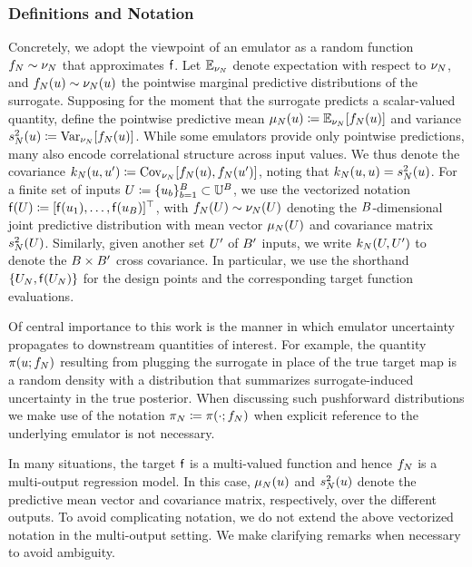 \documentclass[12pt]{article}
\begin{document}
\subsubsection{Definitions and Notation}
Concretely, we adopt the viewpoint of an emulator as a random function $f_{N} \sim \nu_{N}$ that
approximates $\mathsf{f}$. Let $\mathbb{E}_{\nu_{N}}$ denote expectation with respect to $\nu_{N}$, and $f_{N}(u) \sim \nu_{N}(u)$ the pointwise marginal predictive distributions of the surrogate. Supposing for the moment that
the surrogate predicts a scalar-valued quantity, define the pointwise 
predictive mean $\mu_{N}(u) \coloneqq \mathbb{E}_{\nu_{N}}[f_{N}(u)]$ and variance 
$s^2_{N}(u) \coloneqq \mathrm{Var}_{\nu_{N}}[f_{N}(u)]$. While some emulators provide only pointwise predictions,
many also encode correlational structure across input values. We thus denote the covariance
$k_{N}(u, u^\prime) \coloneqq \mathrm{Cov}_{\nu_{N}}[f_{N}(u), f_{N}(u^\prime)]$, 
noting that $k_{N}(u, u) = s^2_{N}(u)$.
For a finite set of inputs $U \coloneqq \{u_b\}_{b=1}^{B} \subset \mathbb{U}^{B}$, we use the 
vectorized notation $\mathsf{f}(U) \coloneqq [\mathsf{f}(u_1), \dots, \mathsf{f}(u_B)]^\top$, with
$f_{N}(U) \sim \nu_{N}(U)$ denoting the $B$-dimensional joint predictive distribution with mean vector $\mu_{N}(U)$ and covariance matrix $s^2_{N}(U)$. Similarly, given another set
$U^\prime$ of $B^\prime$ inputs, we write $k_{N}(U, U^\prime)$ to denote
the $B \times B^\prime$ cross covariance. In particular, we use the shorthand 
$\{U_{N}, \mathsf{f}(U_{N})\}$ for the design points and the corresponding target function evaluations.

Of central importance to this work is the manner in which emulator uncertainty propagates to downstream 
quantities of interest. For example, the quantity $\pi(u; f_{N})$ resulting from plugging
the surrogate in place of the true target map is a random density with a distribution that summarizes
surrogate-induced uncertainty in the true posterior. 
When discussing such pushforward distributions we make use of the 
notation ${\pi}_{N} \coloneqq \pi(\cdot; f_{N})$ when explicit reference to the underlying emulator
is not necessary.

In many situations, the target $\mathsf{f}$ is a multi-valued function and hence $f_{N}$ is a multi-output
regression model. In this case, $\mu_{N}(u)$ and $s^2_{N}(u)$ denote the predictive mean vector and 
covariance matrix, respectively, over the different outputs. To avoid complicating notation, we do not extend
the above vectorized notation in the multi-output setting. We make clarifying remarks when necessary to 
avoid ambiguity.
\end{document}
